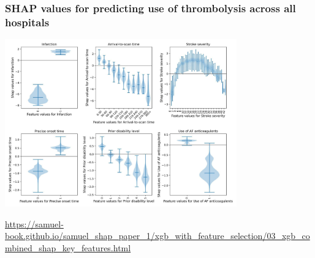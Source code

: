 \documentclass[xcolor={usenames,dvipsnames}]{beamer}
\newcommand{\smallurl}[1]{\textcolor{blue}{\fontsize{4pt}{4.8pt}\selectfont \url{#1}}}
\begin{document}
\begin{frame}
\frametitle{SHAP values for predicting use of thrombolysis across all hospitals}



\vspace{-0.5em}

\begin{center}
    \includegraphics[width=0.75\textwidth]{./images/shap_violins}
\end{center}

\vspace{-1em}

\smallurl{https://samuel-book.github.io/samuel_shap_paper_1/xgb_with_feature_selection/03_xgb_combined_shap_key_features.html}

\end{frame}






\end{document}
